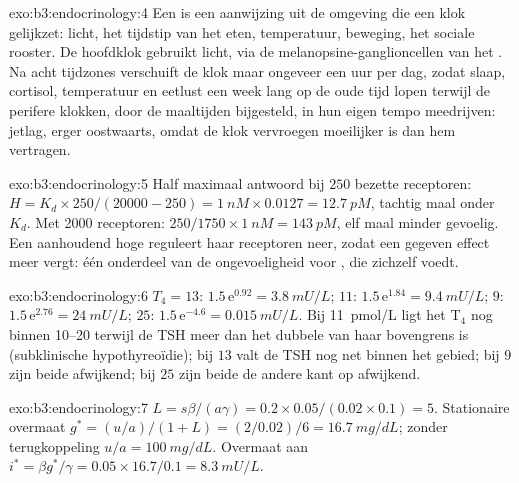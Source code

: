\begin{solution}{exo:b3:endocrinology:4}
Een  is een aanwijzing uit de omgeving die een klok
gelijkzet: licht, het tijdstip van het eten, temperatuur, beweging, het
sociale rooster. De hoofdklok gebruikt licht, via de
melanopsine-ganglioncellen van het . Na acht tijdzones
verschuift de klok maar ongeveer een uur per dag, zodat slaap,
cortisol, temperatuur en eetlust een week lang op de oude tijd lopen
terwijl de perifere klokken, door de maaltijden bijgesteld, in hun
eigen tempo meedrijven: jetlag, erger oostwaarts, omdat de klok
vervroegen moeilijker is dan hem vertragen.
\end{solution}

\begin{solution}{exo:b3:endocrinology:5}
Half maximaal antwoord bij $250$ bezette receptoren: $H = K_{d}\times
250/(\num{20000} - 250) = \qty{1}{nM}\times 0.0127 = \qty{12.7}{pM}$,
tachtig maal onder $K_{d}$. Met \num{2000} receptoren: $250/1750
\times \qty{1}{nM} = \qty{143}{pM}$, elf maal minder gevoelig. Een
aanhoudend hoge  reguleert haar receptoren neer, zodat een
gegeven effect meer  vergt: één onderdeel van de
ongevoeligheid voor , die zichzelf voedt.
\end{solution}

\begin{solution}{exo:b3:endocrinology:6}
$T_{4} = 13$: $1.5\,\mathrm{e}^{0.92} = \qty{3.8}{mU/L}$; $11$:
$1.5\,\mathrm{e}^{1.84} = \qty{9.4}{mU/L}$; $9$: $1.5\,\mathrm{e}^{2.76}
= \qty{24}{mU/L}$; $25$: $1.5\,\mathrm{e}^{-4.6} = \qty{0.015}{mU/L}$.
Bij \qty{11}{pmol/L} ligt het T$_{4}$ nog binnen \qtyrange{10}{20}{}
terwijl de TSH meer dan het dubbele van haar bovengrens is
(subklinische hypothyreoïdie); bij $13$ valt de TSH nog net binnen het
gebied; bij $9$ zijn beide afwijkend; bij $25$ zijn beide de andere
kant op afwijkend.
\end{solution}

\begin{solution}{exo:b3:endocrinology:7}
$L = s\beta/(a\gamma) = 0.2\times 0.05/(0.02\times 0.1) = 5$.
Stationaire overmaat $g^{*} = (u/a)/(1 + L) = (2/0.02)/6 = \qty{16.7}{mg/dL}$;
zonder terugkoppeling $u/a = \qty{100}{mg/dL}$. Overmaat aan 
$i^{*} = \beta g^{*}/
\gamma = 0.05\times 16.7/0.1 = \qty{8.3}{mU/L}$.
\end{solution}

